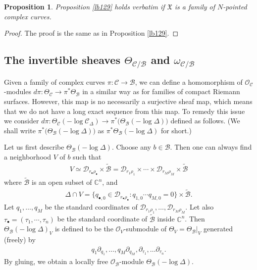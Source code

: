 \documentclass[12pt,b5paper,notitlepage]{report}
\theoremstyle{definition}
\theoremstyle{plain}
\newtheorem{pp}[df]{Proposition}
\newcommand{\fk}{\mathfrak}
\newcommand{\mc}{\mathcal}
\newcommand{\wtd}{\widetilde}
\newcommand{\scr}{\mathscr}
\newcommand{\blt}{\bullet}
\numberwithin{equation}{section}
\begin{document}
\begin{pp}
Proposition \ref{lb129} holds verbatim if $\fk X$ is a family of $N$-pointed complex curves.
\end{pp}

\begin{proof}
The proof is the same as in Proposition \ref{lb129}.
\end{proof}



\subsection*{The invertible sheaves $\Theta_{\mc C/\mc B}$ and $\omega_{\mc C/\mc B}$}

Given a family of complex curves $\pi:\mc C\rightarrow\mc B$, we can define a homomorphism of $\scr O_{\mc C}$-modules $d\pi:\Theta_{\mc C}\rightarrow\pi^*\Theta_{\mc B}$ in a similar way as  for families of compact Riemann surfaces. However, this map is no necessarily a surjective sheaf map, which means that we do not have a long exact sequence from this map. To remedy this issue we consider $d\pi:\Theta_{\mc C}(-\log \mc C_\Delta)\rightarrow \pi^*\big(\Theta_{\mc B}(-\log\Delta)\big)$ defined as follows. (We shall write $\pi^*\big(\Theta_{\mc B}(-\log\Delta)\big)$ as $\pi^*\Theta_{\mc B}(-\log\Delta)$ for short.)

Let us first describe $\Theta_{\mc B}(-\log\Delta)$. \index{zz@$\Theta_{\mc B}(-\log\Delta)$}  Choose any $b\in\mc B$. Then one can always find a  neighborhood $V$ of $b$ such that
\begin{align*}
V\simeq \mc D_{r_\blt\rho_\blt}\times\wtd{\mc B}=\mc D_{r_1\rho_1}\times\cdots\times\mc D_{r_M\rho_M}\times\wtd{\mc B}
\end{align*}
where $\wtd {\mc B}$ is an open subset of $\mathbb C^n$,   and
\begin{align*}
\Delta\cap V=\{q_{\blt,0}\in\mc D_{r_\blt\rho_\blt}:q_{1,0}\cdots q_{M,0}=0\}\times\wtd{\mc B}.
\end{align*}
Let $q_1,\dots,q_M$ be the standard coordinates of $\mc D_{r_1\rho_1},\dots,\mc D_{r_M\rho_M}$. Let also $\tau_\blt=(\tau_1,\cdots,\tau_n)$ be the standard coordinate of $\wtd {\mc B}$ inside $\mathbb C^n$. Then $\Theta_{\mc B}(-\log\Delta)_V$ is defined to be the $\scr O_V$-submodule of $\Theta_V=\Theta_{\mc B}|_V$ generated (freely) by
\begin{align}
q_1\partial_{q_1},\dots,q_M\partial_{q_M},\partial_{\tau_1},\dots\partial_{\tau_n}.\label{eq133}
\end{align}
By gluing, we obtain a locally free $\scr O_{\mc B}$-module $\Theta_{\mc B}(-\log\Delta)$.
\end{document}
